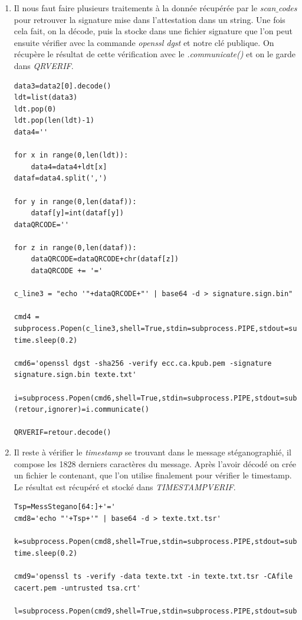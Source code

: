 \documentclass[12pt]{article}
\newcommand{\1}{\mathbbm{1}}
\begin{document}
\begin{enumerate}[label=(\arabic*)]
\item Il nous faut faire plusieurs traitements à la donnée récupérée par le \textit{scan$\_$codes} pour retrouver la signature mise dans l'attestation dans un string. Une fois cela fait, on la décode, puis la stocke dans une fichier signature que l'on peut ensuite vérifier avec la commande \textit{openssl dgst} et notre clé publique. On récupère le résultat de cette vérification avec le \textit{.communicate()} et on le garde dans \textit{QRVERIF}.

\begin{lstlisting}
data3=data2[0].decode()
ldt=list(data3)
ldt.pop(0)
ldt.pop(len(ldt)-1)
data4=''

for x in range(0,len(ldt)):
	data4=data4+ldt[x]
dataf=data4.split(',')

for y in range(0,len(dataf)):
	dataf[y]=int(dataf[y])
dataQRCODE=''

for z in range(0,len(dataf)):
	dataQRCODE=dataQRCODE+chr(dataf[z]) 
	dataQRCODE += '='
	
c_line3 = "echo '"+dataQRCODE+"' | base64 -d > signature.sign.bin"

cmd4 = subprocess.Popen(c_line3,shell=True,stdin=subprocess.PIPE,stdout=subprocess.PIPE)
time.sleep(0.2)

cmd6='openssl dgst -sha256 -verify ecc.ca.kpub.pem -signature signature.sign.bin texte.txt'

i=subprocess.Popen(cmd6,shell=True,stdin=subprocess.PIPE,stdout=subprocess.PIPE)
(retour,ignorer)=i.communicate()

QRVERIF=retour.decode()
\end{lstlisting}
\vspace*{7mm}
\item Il reste à vérifier le \textit{timestamp} se trouvant dans le message stéganographié, il compose les 1828 derniers caractères du message. Après l'avoir décodé on crée un fichier le contenant, que l'on utilise finalement pour vérifier le timestamp. Le résultat est récupéré et stocké dans \textit{TIMESTAMPVERIF}.

\begin{lstlisting}
Tsp=MessStegano[64:]+'='
cmd8='echo "'+Tsp+'" | base64 -d > texte.txt.tsr'

k=subprocess.Popen(cmd8,shell=True,stdin=subprocess.PIPE,stdout=subprocess.PIPE)
time.sleep(0.2)

cmd9='openssl ts -verify -data texte.txt -in texte.txt.tsr -CAfile cacert.pem -untrusted tsa.crt'

l=subprocess.Popen(cmd9,shell=True,stdin=subprocess.PIPE,stdout=subprocess.PIPE)


\end{lstlisting}
\end{enumerate}
\end{document}
